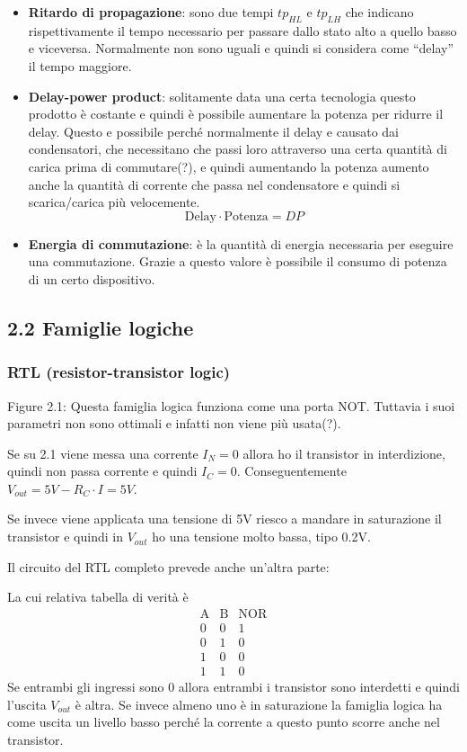 \documentclass[
]{article}
\providecommand{\tightlist}{%
  \setlength{\itemsep}{0pt}\setlength{\parskip}{0pt}}
\begin{document}
\begin{itemize}
\tightlist
\item
  \textbf{Ritardo di propagazione}: sono due tempi \(tp_{HL}\) e
  \(tp_{LH}\) che indicano rispettivamente il tempo necessario per
  passare dallo stato alto a quello basso e viceversa. Normalmente non
  sono uguali e quindi si considera come ``delay'' il tempo maggiore.
\item
  \textbf{Delay-power product}: solitamente data una certa tecnologia
  questo prodotto è costante e quindi è possibile aumentare la potenza
  per ridurre il delay. Questo e possibile perché normalmente il delay e
  causato dai condensatori, che necessitano che passi loro attraverso
  una certa quantità di carica prima di commutare(?), e quindi
  aumentando la potenza aumento anche la quantità di corrente che passa
  nel condensatore e quindi si scarica/carica più velocemente.
  \[\text{Delay}\cdot\text{Potenza}=DP\]
\item
  \textbf{Energia di commutazione}: è la quantità di energia necessaria
  per eseguire una commutazione. Grazie a questo valore è possibile il
  consumo di potenza di un certo dispositivo.
\end{itemize}

\subsection{2.2 Famiglie logiche}\label{famiglie-logiche}

\subsubsection{RTL (resistor-transistor
logic)}\label{rtl-resistor-transistor-logic}

Figure 2.1: Questa famiglia logica funziona come una porta NOT. Tuttavia
i suoi parametri non sono ottimali e infatti non viene più usata(?).

Se su 2.1 viene messa una corrente \(I_{N}=0\) allora ho il transistor
in interdizione, quindi non passa corrente e quindi \(I_{C}=0\).
Conseguentemente \(V_{out}=5V-R_{C}\cdot I=5V\).

Se invece viene applicata una tensione di 5V riesco a mandare in
saturazione il transistor e quindi in \(V_{out}\) ho una tensione molto
bassa, tipo 0.2V.

Il circuito del RTL completo prevede anche un'altra parte:

La cui relativa tabella di verità è \[
\begin{array}{cc|c}\text{A}&\text{B}&\text{NOR}\\\hline0&0&1\\0&1&0\\1&0&0\\1&1&0\end{array}
\] Se entrambi gli ingressi sono 0 allora entrambi i transistor sono
interdetti e quindi l'uscita \(V_{out}\) è altra. Se invece almeno uno è
in saturazione la famiglia logica ha come uscita un livello basso perché
la corrente a questo punto scorre anche nel transistor.
\end{document}
